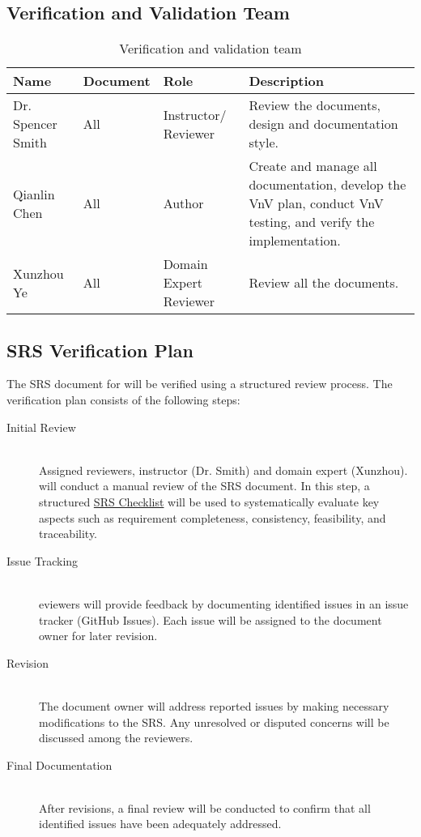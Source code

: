 \documentclass[12pt, titlepage]{article}
\begin{document}
\subsection{Verification and Validation Team} \label{3.1}
\begin{center}
\begin{table}[h]
    \begin{tabular}{ |l|l|p{2cm}|p{5cm}| }
    \hline
    \textbf{Name} & \textbf{Document} & \textbf{Role} & \textbf{Description} \\
    \hline
     Dr. Spencer Smith & All & Instructor/ Reviewer & Review the documents, design and documentation style. \\
     \hline
     Qianlin Chen & All & Author & Create and manage all documentation, develop the VnV plan, conduct VnV testing, and verify the implementation.\\
     \hline
     Xunzhou Ye & All & Domain Expert Reviewer & Review all the documents. \\
    \hline
    \end{tabular} %
\caption{Verification and validation team}
\label{vnvteam}
\end{table}
\end{center}

\subsection{SRS Verification Plan} \label{3.2}
The SRS document for \progname will be verified using a structured review
process. The verification plan consists of the following steps:
\begin{description}
\item[Initial Review] \hfill \\
  Assigned reviewers, instructor (Dr. Smith) and domain expert
  (Xunzhou). will conduct a manual review of the SRS document. In this step, a
  structured
  \href{https://github.com/smiths/capTemplate/blob/9251702fdcb9800c59f6ed3d11d91e2bd62fca6d/docs/Checklists/SRS-Checklist.pdf}{SRS
    Checklist} will be used to systematically evaluate key aspects such as
  requirement completeness, consistency, feasibility, and traceability.
\item[Issue Tracking] \hfill \\
  eviewers will provide feedback by documenting identified issues in an issue
  tracker (GitHub Issues). Each issue will be
  assigned to the document owner for later revision.
\item[Revision] \hfill \\
  The document owner will address reported issues by making necessary
  modifications to the SRS. Any unresolved or disputed concerns will be
  discussed among the reviewers.
\item[Final Documentation] \hfill \\
  After revisions, a final review will be conducted to confirm that all
  identified issues have been adequately addressed.
\end{description}
\end{document}
